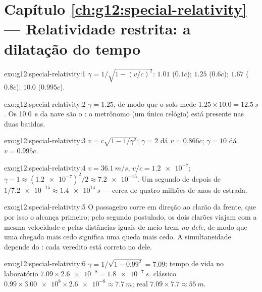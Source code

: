 \section*{Capítulo \ref{ch:g12:special-relativity} --- Relatividade restrita: a dilatação do tempo}

\begin{solution}{exo:g12:special-relativity:1}
$\gamma = 1/\sqrt{1 - (v/c)^2}$: $1.01$ ($0.1c$); $1.25$ ($0.6c$);
$1.67$ ($0.8c$); $10.0$ ($0.995c$).
\end{solution}

\begin{solution}{exo:g12:special-relativity:2}
$\gamma = 1.25$, de modo que o solo mede
$1.25 \times 10.0 = \qty{12.5}{s}$. Os \qty{10.0}{s} da nave são o : o metrônomo (um único relógio) está presente nas duas batidas.
\end{solution}

\begin{solution}{exo:g12:special-relativity:3}
$v = c\sqrt{1 - 1/\gamma^2}$: $\gamma = 2$ dá $v = 0.866c$;
$\gamma = 10$ dá $v = 0.995c$.
\end{solution}

\begin{solution}{exo:g12:special-relativity:4}
$v = \qty{36.1}{m/s}$, $v/c = \num{1.2e-7}$;
$\gamma - 1 \approx (\num{1.2e-7})^2/2 \approx \num{7.2e-15}$. Um segundo
de  depois de $1/\num{7.2e-15} \approx \qty{1.4e14}{s}$ --- cerca de
quatro milhões de anos de estrada.
\end{solution}

\begin{solution}{exo:g12:special-relativity:5}
O passageiro corre em direção ao clarão da frente, que por isso o alcança
primeiro; pelo segundo postulado, os dois clarões viajam com a mesma
velocidade $c$ pelas distâncias iguais de meio trem \emph{no 
dele}, de modo que uma chegada mais cedo significa uma queda mais cedo. A
simultaneidade depende do : cada veredito está correto no
 dele.
\end{solution}

\begin{solution}{exo:g12:special-relativity:6}
$\gamma = 1/\sqrt{1 - 0.99^2} = 7.09$; tempo de vida no laboratório
$7.09 \times \num{2.6e-8} = \qty{1.8e-7}{s}$.  clássico
$0.99 \times \num{3.00e8} \times \num{2.6e-8} \approx \qty{7.7}{m}$; real
$7.09 \times 7.7 \approx \qty{55}{m}$.
\end{solution}

